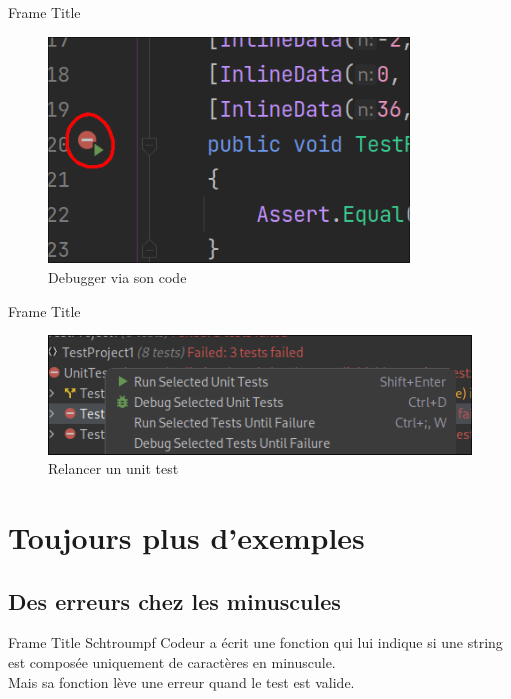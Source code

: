 \documentclass[aspectratio=169]{beamer}
\begin{document}
\begin{frame}{Frame Title}    
\begin{figure}
    \centering
    \includegraphics[height=6cm]{img/debug_unit.png}
    \caption{Debugger via son code}
    \label{fig:debug-button}
\end{figure}
\end{frame}

\begin{frame}{Frame Title}    
\begin{figure}
    \centering
    \includegraphics[width=\textwidth]{img/debug_unit_panel.png}
    \caption{Relancer un unit test}
    \label{fig:debug-button}
\end{figure}
\end{frame}

\section{Toujours plus d'exemples}
\subsection{Des erreurs chez les minuscules}

\begin{frame}{Frame Title}
    Schtroumpf Codeur a écrit une fonction qui lui indique si une string est
    composée uniquement de caractères en minuscule.\\
    \pause
    Mais sa fonction lève une erreur quand le test est valide.
\end{frame}
\end{document}
